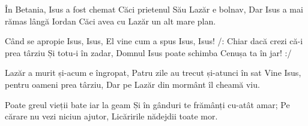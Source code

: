 \beginverse
În Betania, Isus a fost chemat
Căci prietenul Său Lazăr e bolnav,
Dar Isus a mai rămas lângă Iordan
Căci avea cu Lazăr un alt mare plan.
\endverse

\beginchorus
Când se apropie Isus, Isus,
El vine cum a spus Isus, Isus!
/: Chiar dacă crezi că-i prea târziu
Și totu-i în zadar,
Domnul Isus poate schimba
Cenușa ta în jar! :/
\endchorus

\beginverse
Lazăr a murit și-acum e îngropat,
Patru zile au trecut și-atunci în sat
Vine Isus, pentru oameni prea târziu,
Dar pe Lazăr din mormânt îl cheamă viu.
\endverse

\beginverse
Poate greul vieții bate iar la geam
Și în gânduri te frămânți cu-atât amar;
Pe cărare nu vezi niciun ajutor,
Licăririle nădejdii toate mor.
\endverse
\endsong